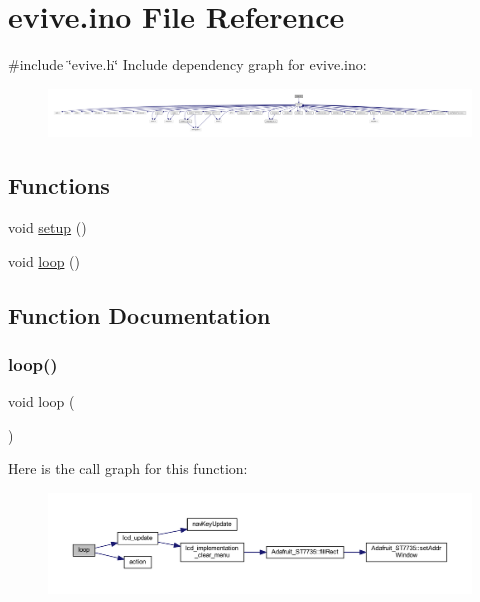 \hypertarget{evive_8ino}{}\section{evive.\+ino File Reference}
\label{evive_8ino}
{\ttfamily \#include \char`\"{}evive.\+h\char`\"{}}\newline
Include dependency graph for evive.\+ino\+:
\nopagebreak
\begin{figure}[H]
\begin{center}
\leavevmode
\includegraphics[width=350pt]{d0/dda/evive_8ino__incl}
\end{center}
\end{figure}
\subsection*{Functions}
\begin{DoxyCompactItemize}
\item 
void \hyperlink{evive_8ino_a4fc01d736fe50cf5b977f755b675f11d}{setup} ()
\item 
void \hyperlink{evive_8ino_afe461d27b9c48d5921c00d521181f12f}{loop} ()
\end{DoxyCompactItemize}


\subsection{Function Documentation}
\mbox{\label{evive_8ino_afe461d27b9c48d5921c00d521181f12f}} 
\subsubsection{\texorpdfstring{loop()}{loop()}}
{\footnotesize\ttfamily void loop (\begin{DoxyParamCaption}{ }\end{DoxyParamCaption})}

Here is the call graph for this function\+:
\nopagebreak
\begin{figure}[H]
\begin{center}
\leavevmode
\includegraphics[width=350pt]{d9/d17/evive_8ino_afe461d27b9c48d5921c00d521181f12f_cgraph}
\end{center}
\end{figure}
\mbox{\label{evive_8ino_a4fc01d736fe50cf5b977f755b675f11d}} 
